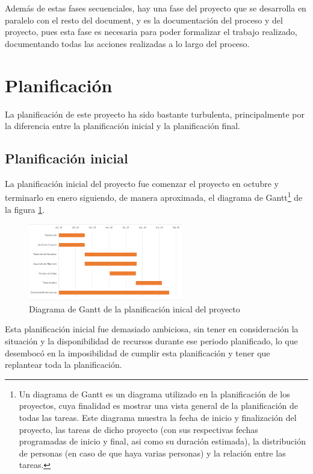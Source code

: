 Además de estas fases secuenciales, hay una fase del proyecto que se desarrolla en paralelo con el resto del document, y es la documentación del proceso y del proyecto, pues esta fase es necesaria para poder formalizar el trabajo realizado, documentando todas las acciones realizadas a lo largo del proceso.

\section{Planificación}

La planificación de este proyecto ha sido bastante turbulenta, principalmente por la diferencia entre la planificación inicial y la planificación final.

\subsection{Planificación inicial}

La planificación inicial del proyecto fue comenzar el proyecto en octubre y terminarlo en enero siguiendo, de manera aproximada, el diagrama de Gantt\footnote{Un diagrama de Gantt\cite{gantt} es un diagrama utilizado en la planificación de los proyectos, cuya finalidad es mostrar una vista general de la planificación de todas las tareas. Este diagrama muestra la fecha de inicio y finalización del proyecto, las tareas de dicho proyecto (con sus respectivas fechas programadas de inicio y final, asi como su duración estimada), la distribución de personas (en caso de que haya varias personas) y la relación entre las tareas.} de la figura \ref{fig:gant1}.
\begin{figure}[tb]
\centering
\includegraphics[width=0.6\textwidth]{figuras/gant1.png}   
\caption{Diagrama de Gantt de la planificación inical del proyecto}
\label{fig:gant1}
\end{figure}

Esta planificación inicial fue demasiado ambiciosa, sin tener en consideración la situación y la disponibilidad de recursos durante ese periodo planificado, lo que desembocó en la imposibilidad de cumplir esta planificación y tener que replantear toda la planificación.

